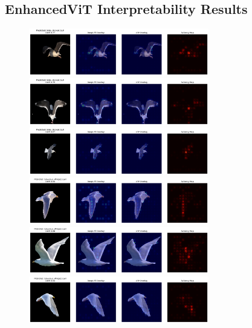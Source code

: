 \documentclass[a4paper,12pt]{report}
\begin{document}
\subsection{EnhancedViT Interpretability Results}
\begin{figure}[H]
    \centering
    \includegraphics[width=0.7\textwidth]{images/appendix/vitenhancedcombined/003_combined.png}\\[1ex]
    \includegraphics[width=0.7\textwidth]{images/appendix/vitenhancedcombined/004_combined.png}\\[1ex]
    \includegraphics[width=0.7\textwidth]{images/appendix/vitenhancedcombined/005_combined.png}\\[1ex]
    \includegraphics[width=0.7\textwidth]{images/appendix/vitenhancedcombined/016_combined.png}\\[1ex]
    \includegraphics[width=0.7\textwidth]{images/appendix/vitenhancedcombined/017_combined.png}\\[1ex]
    \includegraphics[width=0.7\textwidth]{images/appendix/vitenhancedcombined/070_combined.png}
\end{figure}
\end{document}
